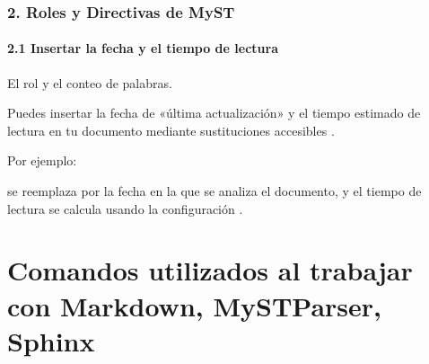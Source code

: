 \documentclass[a4paper,10pt,oneside,spanish,openany]{sphinxmanual}
\begin{document}
\subsubsection{2. Roles y Directivas de MyST}
\label{\detokenize{configuracion_inicial/013.guia_de_myst_parser:roles-y-directivas-de-myst}}

\paragraph{2.1 Insertar la fecha y el tiempo de lectura}
\label{\detokenize{configuracion_inicial/013.guia_de_myst_parser:insertar-la-fecha-y-el-tiempo-de-lectura}}
\sphinxAtStartPar
{}El rol  y el conteo de palabras.

\sphinxAtStartPar
Puedes insertar la fecha de «última actualización» y el tiempo estimado de lectura en tu documento mediante sustituciones accesibles  .

\sphinxAtStartPar
Por ejemplo:

\begin{sphinxVerbatim}[commandchars=\\\{\}]
\end{sphinxVerbatim}

\sphinxAtStartPar
{} se reemplaza por la fecha en la que se analiza el documento, y el tiempo de lectura se calcula usando la configuración .

\sphinxstepscope


\section{Comandos utilizados al trabajar con Markdown, MyST\sphinxhyphen{}Parser, Sphinx}
\label{\detokenize{comandos_mas_usados/comandos:comandos-utilizados-al-trabajar-con-markdown-myst-parser-sphinx}}\label{\detokenize{comandos_mas_usados/comandos::doc}}

\subsection{}
\label{\detokenize{comandos_mas_usados/comandos:crear-un-entorno-virtual}}
\begin{sphinxVerbatim}[commandchars=\\\{\}]
   
\end{sphinxVerbatim}
\end{document}
